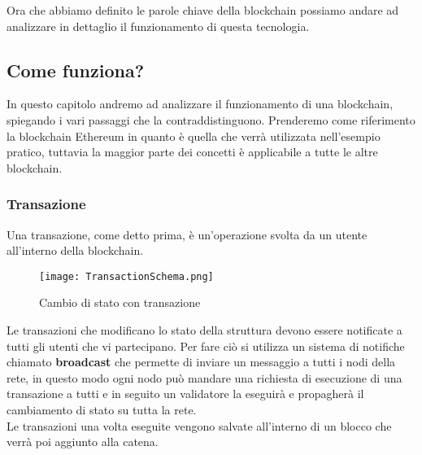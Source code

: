 Ora che abbiamo definito le parole chiave della blockchain possiamo andare ad
analizzare in dettaglio il funzionamento di questa tecnologia.

\newpage

\subsection{Come funziona?}
In questo capitolo andremo ad analizzare il funzionamento di una blockchain,
spiegando i vari passaggi che la contraddistinguono. Prenderemo come
riferimento la blockchain Ethereum in quanto è quella che verrà utilizzata
nell'esempio pratico, tuttavia la maggior parte dei concetti è applicabile 
a tutte le altre blockchain.

\subsubsection{Transazione}
Una transazione, come detto prima, è un'operazione svolta da un utente
all'interno della blockchain. 

\begin{figure}[H]
    \centering
    \texttt{[image: TransactionSchema.png]} 
    \caption{Cambio di stato con transazione}
    \label{fig:transactionSchema}
\end{figure}

Le transazioni che modificano lo stato della struttura devono essere notificate
a tutti gli utenti che vi partecipano. Per fare ciò si utilizza un sistema di
notifiche chiamato \textbf{broadcast} che permette di inviare un messaggio a
tutti i nodi della rete, in questo modo ogni nodo può mandare una richiesta di
esecuzione di una transazione a tutti e in seguito un validatore la eseguirà e
propagherà il cambiamento di stato su tutta la rete. \\
Le transazioni una volta eseguite vengono salvate all'interno di un blocco che
verrà poi aggiunto alla catena.

